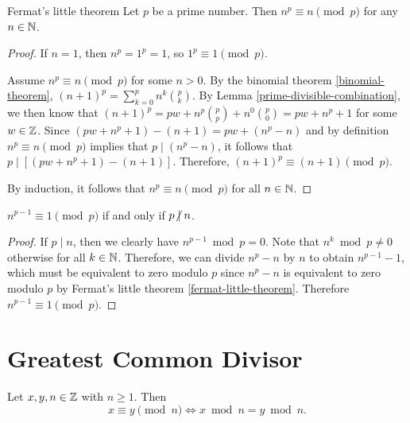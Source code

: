 \begin{thm}{Fermat's little theorem}\label{fermat-little-theorem}\proofbreak
    Let $p$ be a prime number. Then $n^p \equiv n \pmod p$ for any $n \in \mathbb{N}$.
\end{thm}

\begin{proof}
    If $n = 1$, then $n^p = 1^p = 1$, so $1^p \equiv 1 \pmod p$.

    Assume $n^p \equiv n \pmod p$ for some $n > 0$. By the binomial theorem \ref{binomial-theorem}, $(n+1)^p = \sum_{k=0}^pn^k\binom{p}{k}$. By Lemma \ref{prime-divisible-combination}, we then know that $(n+1)^p = pw + n^p\binom{p}{p} + n^0\binom{p}{0} = pw + n^p + 1$ for some $w \in \mathbb{Z}$. Since $(pw + n^p + 1) - (n + 1) = pw + (n^p - n)$ and by definition $n^p \equiv n \pmod p$ implies that $p \mid (n^p - n)$, it follows that $p \mid \left[(pw + n^p + 1) - (n + 1)\right]$. Therefore, $(n+1)^p \equiv (n+1) \pmod p$.

    By induction, it follows that $n^p \equiv n \pmod p$ for all $n \in \mathbb{N}$.
\end{proof}

\begin{cor}\label{fermat-little-corallary}
    $n^{p-1} \equiv 1 \pmod p$ if and only if $p \centernot\mid n$.
\end{cor}

\begin{proof}
    If $p \mid n$, then we clearly have $n^{p-1} \bmod p = 0$. Note that $n^{k} \bmod p \neq 0$ otherwise for all $k \in \mathbb{N}$. Therefore, we can divide $n^{p} - n$ by $n$ to obtain $n^{p-1} - 1$, which must be equivalent to zero modulo $p$ since $n^{p} - n$ is equivalent to zero modulo $p$ by Fermat's little theorem \ref{fermat-little-theorem}. Therefore $n^{p-1} \equiv 1 \pmod p$.
\end{proof}

\section{Greatest Common Divisor}

\begin{prop}\label{equiv-modular-remainder}
    Let $x, y, n \in \mathbb{Z}$ with $n \geq 1$. Then
    \[x \equiv y \pmod n \iff x \bmod n = y \bmod n.\]
\end{prop}

